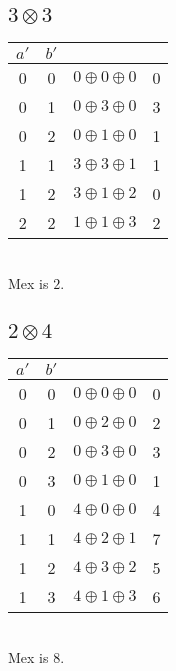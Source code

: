 \documentclass[11pt,twoside]{scrartcl}
\begin{document}
\subsection{$3 \otimes 3$}
\begin{tabular}{cc|l|l}
    $a'$ & $b'$ & & \\ \hline
    0 & 0 & $0 \oplus 0 \oplus 0$ & 0 \\
    0 & 1 & $0 \oplus 3 \oplus 0$ & 3 \\
    0 & 2 & $0 \oplus 1 \oplus 0$ & 1 \\
    1 & 1 & $3 \oplus 3 \oplus 1$ & 1 \\
    1 & 2 & $3 \oplus 1 \oplus 2$ & 0 \\
    2 & 2 & $1 \oplus 1 \oplus 3$ & 2 
\end{tabular}
\ \vspace{6pt} \\ 
Mex is $2$.

\subsection{$2 \otimes 4$}
\begin{tabular}{cc|l|l}
    $a'$ & $b'$ & & \\ \hline
    0 & 0 & $0 \oplus 0 \oplus 0$ & 0 \\
    0 & 1 & $0 \oplus 2 \oplus 0$ & 2 \\
    0 & 2 & $0 \oplus 3 \oplus 0$ & 3 \\
    0 & 3 & $0 \oplus 1 \oplus 0$ & 1 \\
    1 & 0 & $4 \oplus 0 \oplus 0$ & 4 \\
    1 & 1 & $4 \oplus 2 \oplus 1$ & 7 \\
    1 & 2 & $4 \oplus 3 \oplus 2$ & 5 \\ 
    1 & 3 & $4 \oplus 1 \oplus 3$ & 6 
\end{tabular}
\ \vspace{6pt} \\ 
Mex is $8$.
\end{document}
